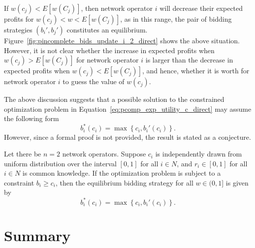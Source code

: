 If $w(c_j) < E[w(C_j)]$, then network operator $i$ will decrease their expected profits for $w(c_j) < w < E[w(C_j)]$, as in this range, the pair of bidding strategies $(b_i',b_j')$ constitutes an equilibrium. Figure~\ref{fig:pincomplete_bids_update_i_2_direct} shows the above situation. However, it is not clear whether the increase in expected profits when $w(c_j) > E[w(C_j)]$ for network operator $i$ is larger than the decrease in expected profits when $w(c_j) < E[w(C_j)]$, and hence, whether it is worth for network operator $i$ to guess the value of $w(c_j)$.

The above discussion suggests that a possible solution to the constrained optimization problem in Equation~\eqref{eq:pcomp_exp_utility_c_direct} may assume the following form
\begin{equation*}
	b_i^*(c_i) = \max\left\{ c_i, b_i'(c_i) \right\}.
\end{equation*}
However, since a formal proof is not provided, the result is stated as a conjecture.
\begin{conjecture}
\label{conj:pcomp_max_equi_bidding_str_direct}
Let there be $n=2$ network operators. Suppose $c_i$ is independently drawn from uniform distribution over the interval $[0,1]$ for all $i\in N$, and $r_i\in [0,1]$ for all $i\in N$ is common knowledge. If the optimization problem is subject to a constraint $b_i\ge c_i$, then the equilibrium bidding strategy for all $w\in (0,1]$ is given by
\begin{equation}
\label{eq:pcomp_equi_bidding_str_max_direct}
	b_i^*(c_i) = \max\left\{ c_i, b_i'(c_i) \right\}.
\end{equation}
\end{conjecture}

\section{Summary} %
\label{sec:summary_direct}


